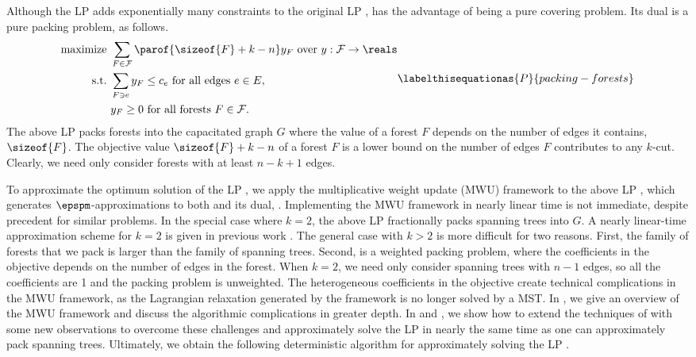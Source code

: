 \documentclass{toc}
\newcommand{\costof}[1]{c_{#1}}
\newcommand{\capacityof}{\costof}%
\newcommand{\forests}{\mathcal{F}} %
\begin{document}
Although the LP  adds exponentially many constraints
to the original LP ,  has the
advantage of being a pure covering problem. Its dual is a pure packing
problem, as follows.
\begin{align}
  \begin{aligned}
    \text{maximize } & \sum_{F \in \forests} \parof{\sizeof{F} + k -
      n} y_F %
    \text{ over } y: \forests \to \reals %
    \\
    \text{ s.t.\ } & \sum_{F \ni e} y_F \leq \capacityof{e} \text{ for
      all
      edges } e \in E,\\
    & y_F \geq 0 \text{ for all forests } F \in \forests.
  \end{aligned}
      \labelthisequationas{P}{packing-forests}
\end{align}
The above LP packs forests into the capacitated graph $G$ where the
value of a forest $F$ depends on the number of edges it contains,
$\sizeof{F}$. The objective value $\sizeof{F} + k - n$ of a forest $F$
is a lower bound on the number of edges $F$ contributes to any
$k$-cut.  Clearly, we need only consider forests with at least
$n - k + 1$ edges.

To approximate %
%
%
%
%
%
the optimum solution of the  %
%
LP , we apply the
multiplicative weight update (MWU)
framework to the above LP
, which generates
%
$\epspm$-approximations  %
to both  and its dual,
.  Implementing the MWU framework in nearly linear
time is not immediate, despite precedent for similar problems.  In the
special case where $k = 2$, the above LP 
fractionally packs spanning trees into $G$.  A nearly
%
linear-time  %
approximation scheme for $k = 2$ is given in previous work
\cite{cq-17-soda}. The general case with $k > 2$ is more difficult for
two reasons. First, the family of forests that we pack is larger than
the family of spanning trees. Second,  is
a weighted packing problem, where the coefficients in the objective
depends on the number of edges in the forest. When $k = 2$, we need
only consider spanning trees with $n - 1$ edges, so all the
coefficients are 1 and the packing problem is unweighted.  The
heterogeneous coefficients in the objective create technical
complications in the MWU framework, as the Lagrangian relaxation
generated by the framework is no longer solved by a MST. In
, we give an overview of the MWU framework and discuss
the algorithmic complications in greater depth.  In
 and , we show
how to extend the techniques of \cite{cq-17-soda} with some new
observations to overcome these challenges and %
%
approximately solve %
%
the LP
 in nearly the same time as one can
approximately pack spanning trees. Ultimately, we obtain the following
deterministic algorithm for
%
approximately solving %
the LP .
\end{document}
